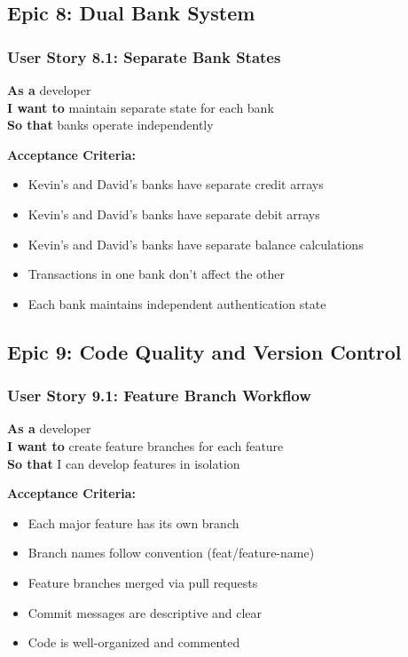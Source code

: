 \documentclass[11pt,a4paper]{article}
\begin{document}
\subsection{Epic 8: Dual Bank System}

\subsubsection{User Story 8.1: Separate Bank States}
\textbf{As a} developer\\
\textbf{I want to} maintain separate state for each bank\\
\textbf{So that} banks operate independently

\textbf{Acceptance Criteria:}
\begin{itemize}[leftmargin=*]
    \item Kevin's and David's banks have separate credit arrays
    \item Kevin's and David's banks have separate debit arrays
    \item Kevin's and David's banks have separate balance calculations
    \item Transactions in one bank don't affect the other
    \item Each bank maintains independent authentication state
\end{itemize}

\subsection{Epic 9: Code Quality and Version Control}

\subsubsection{User Story 9.1: Feature Branch Workflow}
\textbf{As a} developer\\
\textbf{I want to} create feature branches for each feature\\
\textbf{So that} I can develop features in isolation

\textbf{Acceptance Criteria:}
\begin{itemize}[leftmargin=*]
    \item Each major feature has its own branch
    \item Branch names follow convention (feat/feature-name)
    \item Feature branches merged via pull requests
    \item Commit messages are descriptive and clear
    \item Code is well-organized and commented
\end{itemize}
\end{document}
